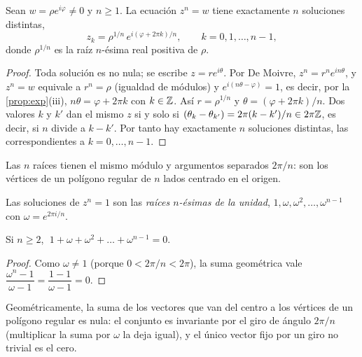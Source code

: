 \begin{teorema}\label{teo:raices}
Sean $w=\rho e^{i\varphi}\ne0$ y $n\ge1$. La ecuación $z^{n}=w$ tiene exactamente $n$ soluciones distintas,
\[
z_k=\rho^{1/n}\,e^{i(\varphi+2\pi k)/n},\qquad k=0,1,\dots,n-1,
\]
donde $\rho^{1/n}$ es la raíz $n$-ésima real positiva de $\rho$.
\end{teorema}

\begin{proof}
Toda solución es no nula; se escribe $z=re^{i\theta}$. Por De Moivre, $z^{n}=r^{n}e^{in\theta}$, y $z^{n}=w$ equivale a $r^{n}=\rho$ (igualdad de módulos) y $e^{i(n\theta-\varphi)}=1$, es decir, por la \cref{prop:exp}(iii), $n\theta=\varphi+2\pi k$ con $k\in\mathbb{Z}$. Así $r=\rho^{1/n}$ y $\theta=(\varphi+2\pi k)/n$. Dos valores $k$ y $k'$ dan el mismo $z$ si y solo si $(\theta_k-\theta_{k'})=2\pi(k-k')/n\in2\pi\mathbb{Z}$, es decir, si $n$ divide a $k-k'$. Por tanto hay exactamente $n$ soluciones distintas, las correspondientes a $k=0,\dots,n-1$.
\end{proof}

Las $n$ raíces tienen el mismo módulo y argumentos separados $2\pi/n$: son los vértices de un polígono regular de $n$ lados centrado en el origen.

\begin{definicion}
Las soluciones de $z^{n}=1$ son las \emph{raíces $n$-ésimas de la unidad}, $1,\omega,\omega^{2},\dots,\omega^{n-1}$ con $\omega=e^{2\pi i/n}$.
\end{definicion}

\begin{proposicion}\label{prop:suma-raices}
Si $n\ge2$, $\;1+\omega+\omega^{2}+\dots+\omega^{n-1}=0$.
\end{proposicion}

\begin{proof}
Como $\omega\ne1$ (porque $0<2\pi/n<2\pi$), la suma geométrica vale $\dfrac{\omega^{n}-1}{\omega-1}=\dfrac{1-1}{\omega-1}=0$.
\end{proof}

Geométricamente, la suma de los vectores que van del centro a los vértices de un polígono regular es nula: el conjunto es invariante por el giro de ángulo $2\pi/n$ (multiplicar la suma por $\omega$ la deja igual), y el único vector fijo por un giro no trivial es el cero.

